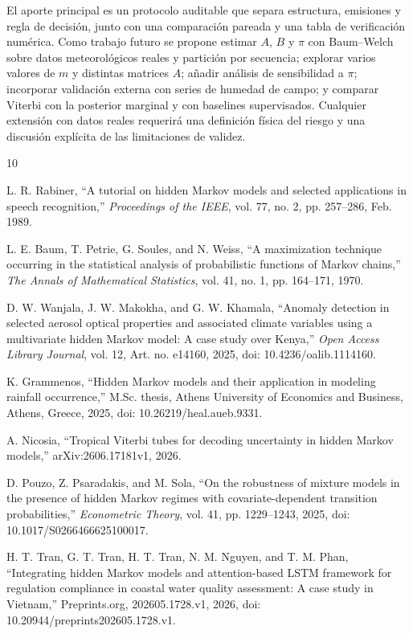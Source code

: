 \documentclass[11pt,letterpaper]{article}
\begin{document}
El aporte principal es un protocolo auditable que separa estructura, emisiones y regla de decisión, junto con una comparación pareada y una tabla de verificación numérica. Como trabajo futuro se propone estimar \(A\), \(B\) y \(\pi\) con Baum--Welch sobre datos meteorológicos reales y partición por secuencia; explorar varios valores de \(m\) y distintas matrices \(A\); añadir análisis de sensibilidad a \(\pi\); incorporar validación externa con series de humedad de campo; y comparar Viterbi con la posterior marginal y con baselines supervisados. Cualquier extensión con datos reales requerirá una definición física del riesgo y una discusión explícita de las limitaciones de validez.

\begin{thebibliography}{10}

L. R. Rabiner, ``A tutorial on hidden Markov models and selected applications in speech recognition,'' \emph{Proceedings of the IEEE}, vol. 77, no. 2, pp. 257--286, Feb. 1989.

L. E. Baum, T. Petrie, G. Soules, and N. Weiss, ``A maximization technique occurring in the statistical analysis of probabilistic functions of Markov chains,'' \emph{The Annals of Mathematical Statistics}, vol. 41, no. 1, pp. 164--171, 1970.

D. W. Wanjala, J. W. Makokha, and G. W. Khamala, ``Anomaly detection in selected aerosol optical properties and associated climate variables using a multivariate hidden Markov model: A case study over Kenya,'' \emph{Open Access Library Journal}, vol. 12, Art. no. e14160, 2025, doi: 10.4236/oalib.1114160.

K. Grammenos, ``Hidden Markov models and their application in modeling rainfall occurrence,'' M.Sc. thesis, Athens University of Economics and Business, Athens, Greece, 2025, doi: 10.26219/heal.aueb.9331.

A. Nicosia, ``Tropical Viterbi tubes for decoding uncertainty in hidden Markov models,'' arXiv:2606.17181v1, 2026.

D. Pouzo, Z. Psaradakis, and M. Sola, ``On the robustness of mixture models in the presence of hidden Markov regimes with covariate-dependent transition probabilities,'' \emph{Econometric Theory}, vol. 41, pp. 1229--1243, 2025, doi: 10.1017/S0266466625100017.

H. T. Tran, G. T. Tran, H. T. Tran, N. M. Nguyen, and T. M. Phan, ``Integrating hidden Markov models and attention-based LSTM framework for regulation compliance in coastal water quality assessment: A case study in Vietnam,'' Preprints.org, 202605.1728.v1, 2026, doi: 10.20944/preprints202605.1728.v1.


\end{thebibliography}
\end{document}
